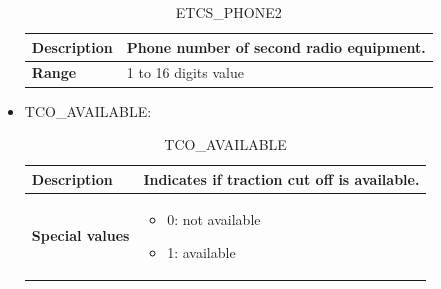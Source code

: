 \begin{itemize}
			\begin{longtable}{|l|l|}
				\caption{ETCS\_PHONE2}\\
				\hline

					\begin{minipage}[t]{0.22\linewidth} \textbf{Description}	\end{minipage}
				&	\begin{minipage}[t]{0.78\linewidth} Phone number of second radio equipment. \end{minipage} \\

				\hline

					\begin{minipage}[t]{0.22\linewidth} \textbf{Range}	\end{minipage}
				&	\begin{minipage}[t]{0.78\linewidth} 1 to 16 digits value \end{minipage} \\

				\hline

			\end{longtable}

		\item TCO\_AVAILABLE:

			\begin{longtable}{|l|l|}
				\caption{TCO\_AVAILABLE}\\
				\hline

					\begin{minipage}[t]{0.22\linewidth} \textbf{Description}	\end{minipage}
				&	\begin{minipage}[t]{0.78\linewidth} Indicates if traction cut off is available. \end{minipage} \\

				\hline

					\begin{minipage}[t]{0.22\linewidth} \textbf{Special values}	\end{minipage}
				&	\begin{minipage}[t]{0.78\linewidth} \begin{itemize} \item 0: not available \item 1: available \end{itemize} \end{minipage} \\

				\hline


\end{longtable}
\end{itemize}
